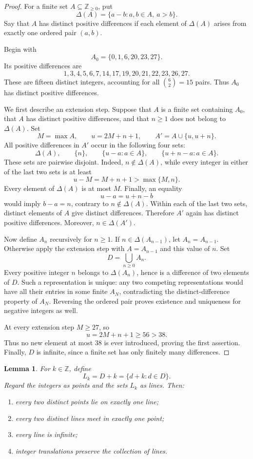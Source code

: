 \documentclass[11pt]{article}
\newcommand{\ZZ}{\mathbb{Z}}
\newtheorem{lemma}[theorem]{Lemma}
\begin{document}
\begin{proof}
For a finite set \(A\subseteq\ZZ_{\geq 0}\), put
\[
    \Delta(A)=\{a-b:a,b\in A,\ a>b\}.
\]
Say that \(A\) has distinct positive differences if each element of
\(\Delta(A)\) arises from exactly one ordered pair \((a,b)\).

Begin with
\[
    A_0=\{0,1,6,20,23,27\}.
\]
Its positive differences are
\[
    1,3,4,5,6,7,14,17,19,20,21,22,23,26,27.
\]
These are fifteen distinct integers, accounting for all
\(\binom{6}{2}=15\) pairs. Thus \(A_0\) has distinct positive differences.

We first describe an extension step. Suppose that \(A\) is a finite set
containing \(A_0\), that \(A\) has distinct positive differences, and that
\(n\geq 1\) does not belong to \(\Delta(A)\). Set
\[
    M=\max A,\qquad u=2M+n+1,
    \qquad A'=A\cup\{u,u+n\}.
\]
All positive differences in \(A'\) occur in the following four sets:
\[
    \Delta(A),\qquad
    \{n\},\qquad
    \{u-a:a\in A\},\qquad
    \{u+n-a:a\in A\}.
\]
These sets are pairwise disjoint. Indeed, \(n\notin\Delta(A)\), while every
integer in either of the last two sets is at least
\[
    u-M=M+n+1>\max\{M,n\}.
\]
Every element of \(\Delta(A)\) is at most \(M\). Finally, an equality
\[
    u-a=u+n-b
\]
would imply \(b-a=n\), contrary to \(n\notin\Delta(A)\).
Within each of the last two sets, distinct elements of \(A\) give distinct
differences. Therefore \(A'\) again has distinct positive differences.
Moreover, \(n\in\Delta(A')\).

Now define \(A_n\) recursively for \(n\geq 1\). If
\(n\in\Delta(A_{n-1})\), let \(A_n=A_{n-1}\). Otherwise apply the extension
step with \(A=A_{n-1}\) and this value of \(n\). Set
\[
    D=\bigcup_{n\geq 0}A_n.
\]
Every positive integer \(n\) belongs to \(\Delta(A_n)\), hence is a
difference of two elements of \(D\). Such a representation is unique:
any two competing representations would have all their entries in some
finite \(A_N\), contradicting the distinct-difference property of \(A_N\).
Reversing the ordered pair proves existence and uniqueness for negative
integers as well.

At every extension step \(M\geq 27\), so
\[
    u=2M+n+1\geq 56>38.
\]
Thus no new element at most \(38\) is ever introduced, proving the first
assertion. Finally, \(D\) is infinite, since a finite set has only finitely
many differences.
\end{proof}
\begin{lemma}\label{lem:incidence}
For \(k\in\ZZ\), define
\[
    L_k=D+k=\{d+k:d\in D\}.
\]
Regard the integers as points and the sets \(L_k\) as lines. Then:
\begin{enumerate}
    \item every two distinct points lie on exactly one line;
    \item every two distinct lines meet in exactly one point;
    \item every line is infinite;
    \item integer translations preserve the collection of lines.
\end{enumerate}
\end{lemma}
\end{document}
